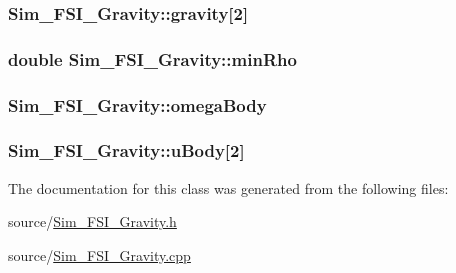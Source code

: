 \subsubsection[{gravity}]{ Sim\+\_\+\+F\+S\+I\+\_\+\+Gravity\+::gravity\mbox{[}2\mbox{]}\hspace{0.3cm}{\ttfamily [protected]}}\label{class_sim___f_s_i___gravity_a4056a32c94c0375219f3248e29df7535}
\hypertarget{class_sim___f_s_i___gravity_a29e377488239d27f0a112ce9e4bf1e97}{}
\subsubsection[{min\+Rho}]{\setlength{\rightskip}{0pt plus 5cm}double Sim\+\_\+\+F\+S\+I\+\_\+\+Gravity\+::min\+Rho\hspace{0.3cm}{\ttfamily [protected]}}\label{class_sim___f_s_i___gravity_a29e377488239d27f0a112ce9e4bf1e97}
\hypertarget{class_sim___f_s_i___gravity_aaae0c523f41a6427f5ade85a53ab6e0e}{}
\subsubsection[{omega\+Body}]{ Sim\+\_\+\+F\+S\+I\+\_\+\+Gravity\+::omega\+Body\hspace{0.3cm}{\ttfamily [protected]}}\label{class_sim___f_s_i___gravity_aaae0c523f41a6427f5ade85a53ab6e0e}
\hypertarget{class_sim___f_s_i___gravity_af025ee4e8818049798588010ed5ec20b}{}
\subsubsection[{u\+Body}]{ Sim\+\_\+\+F\+S\+I\+\_\+\+Gravity\+::u\+Body\mbox{[}2\mbox{]}\hspace{0.3cm}{\ttfamily [protected]}}\label{class_sim___f_s_i___gravity_af025ee4e8818049798588010ed5ec20b}


The documentation for this class was generated from the following files\+:\begin{DoxyCompactItemize}
\item 
source/\hyperlink{_sim___f_s_i___gravity_8h}{Sim\+\_\+\+F\+S\+I\+\_\+\+Gravity.\+h}\item 
source/\hyperlink{_sim___f_s_i___gravity_8cpp}{Sim\+\_\+\+F\+S\+I\+\_\+\+Gravity.\+cpp}\end{DoxyCompactItemize}
